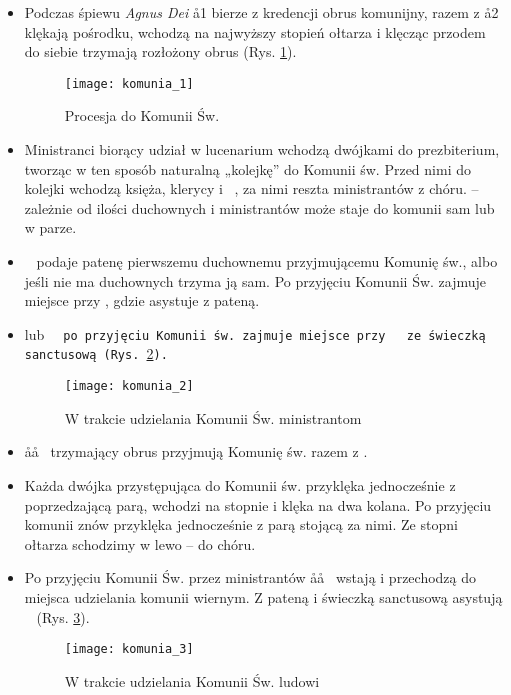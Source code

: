 			\begin{itemize}
				\item Podczas śpiewu \textit{Agnus Dei} \aa1 bierze z kredencji obrus komunijny, razem z \aa2 klękają pośrodku, wchodzą na najwyższy stopień ołtarza i klęcząc przodem do siebie trzymają rozłożony obrus (Rys. \ref{fig:komunia_1}).
				
					\begin{figure}[h]
						\centering
						\texttt{[image: komunia\_1]}
						\caption{Procesja do Komunii Św.}
						\label{fig:komunia_1}
					\end{figure}
				
				\item Ministranci biorący udział w lucenarium wchodzą dwójkami do prezbiterium, tworząc w ten sposób naturalną „kolejkę” do Komunii św. Przed nimi do kolejki wchodzą księża, klerycy i \cc~, za nimi reszta ministrantów z chóru.  – zależnie od ilości duchownych i ministrantów może staje do komunii sam lub w parze.
				\item \cc~ podaje patenę pierwszemu duchownemu przyjmującemu Komunię św., albo jeśli nie ma duchownych trzyma ją sam. Po przyjęciu Komunii Św. zajmuje miejsce przy \ii, gdzie asystuje z pateną.
				\item {} lub \tt~ po przyjęciu Komunii św. zajmuje miejsce przy \ii~ ze świeczką sanctusową (Rys. \ref{fig:komunia_2}).
				
					\begin{figure}[h]
						\centering
						\texttt{[image: komunia\_2]}
						\caption{W trakcie udzielania Komunii Św. ministrantom}
						\label{fig:komunia_2}
					\end{figure}
				
				\item \aa\aa~ trzymający obrus przyjmują Komunię św. razem z .
				\item Każda dwójka przystępująca do Komunii św. przyklęka jednocześnie z poprzedzającą parą, wchodzi na stopnie i klęka na dwa kolana. Po przyjęciu komunii znów przyklęka jednocześnie z parą stojącą za nimi. Ze stopni ołtarza schodzimy w lewo – do chóru.
				\item Po przyjęciu Komunii Św. przez ministrantów \aa\aa~ wstają i przechodzą do miejsca udzielania komunii wiernym. Z pateną i świeczką sanctusową asystują \cc\cc~ (Rys. \ref{fig:komunia_3}).
				
					\begin{figure}[h]
						\centering
						\texttt{[image: komunia\_3]}
						\caption{W trakcie udzielania Komunii Św. ludowi}
						\label{fig:komunia_3}
					\end{figure}
				
			\end{itemize}
		
